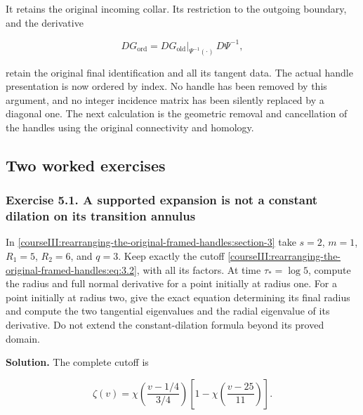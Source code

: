 It retains the original incoming collar. Its restriction to the outgoing boundary, and the derivative

\begin{equation}
DG_{\mathrm{ord}}
=DG_{\mathrm{old}}|_{\Psi^{-1}(\cdot)}\,D\Psi^{-1},
\label{courseIII:rearranging-the-original-framed-handles:eq:4.17}
\end{equation}

retain the original final identification and all its tangent data. The actual handle presentation is now ordered by index. No handle has been removed by this argument, and no integer incidence matrix has been silently replaced by a diagonal one. The next calculation is the geometric removal and cancellation of the handles using the original connectivity and homology.

\subsection{Two worked exercises}
\label{courseIII:rearranging-the-original-framed-handles:arrangement-exercises}

\label{courseIII:rearranging-the-original-framed-handles:section-5}

\subsubsection{Exercise 5.1. A supported expansion is not a constant dilation on its transition annulus}
\label{courseIII:rearranging-the-original-framed-handles:exercise-5.1}

\label{courseIII:handle-arrangement:5.1}

In \cref{courseIII:rearranging-the-original-framed-handles:section-3} take \(s=2\), \(m=1\), \(R_1=5\), \(R_2=6\), and \(q=3\). Keep exactly the cutoff \eqref{courseIII:rearranging-the-original-framed-handles:eq:3.2}, with all its factors. At time \(\tau_*=\log5\), compute the radius and full normal derivative for a point initially at radius one. For a point initially at radius two, give the exact equation determining its final radius and compute the two tangential eigenvalues and the radial eigenvalue of its derivative. Do not extend the constant-dilation formula beyond its proved domain.

\textbf{Solution.} The complete cutoff is

\begin{equation}
\zeta(v)=
\chi\left(\frac{v-1/4}{3/4}\right)
\left[1-\chi\left(\frac{v-25}{11}\right)\right].
\label{courseIII:rearranging-the-original-framed-handles:eq:5.1}
\end{equation}

